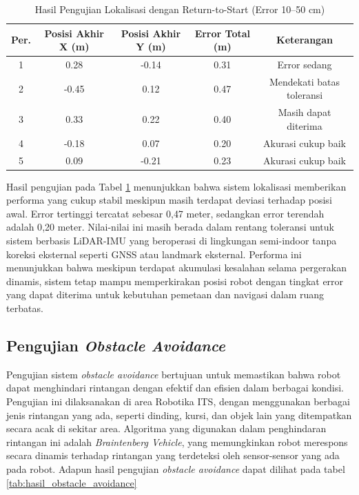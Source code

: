 \begin{table}[H]
	\centering
	\caption{Hasil Pengujian Lokalisasi dengan Return-to-Start (Error 10--50 cm)}
	\label{tab:hasil_localization}
	\begin{tabular}{|c|c|c|c|c|}
		\hline
		\textbf{Per.} & \textbf{Posisi Akhir X (m)} & \textbf{Posisi Akhir Y (m)} & \textbf{Error Total (m)} & \textbf{Keterangan}       \\
		\hline
		1             & 0.28                        & -0.14                       & 0.31                     & Error sedang              \\
		2             & -0.45                       & 0.12                        & 0.47                     & Mendekati batas toleransi \\
		3             & 0.33                        & 0.22                        & 0.40                     & Masih dapat diterima      \\
		4             & -0.18                       & 0.07                        & 0.20                     & Akurasi cukup baik        \\
		5             & 0.09                        & -0.21                       & 0.23                     & Akurasi cukup baik        \\
		\hline
	\end{tabular}
\end{table}

Hasil pengujian pada Tabel \ref{tab:hasil_localization} menunjukkan bahwa sistem lokalisasi memberikan performa yang cukup stabil meskipun masih terdapat deviasi terhadap posisi awal. Error tertinggi tercatat sebesar 0{,}47 meter, sedangkan error terendah adalah 0{,}20 meter. Nilai-nilai ini masih berada dalam rentang toleransi untuk sistem berbasis LiDAR-IMU yang beroperasi di lingkungan semi-indoor tanpa koreksi eksternal seperti GNSS atau landmark eksternal. Performa ini menunjukkan bahwa meskipun terdapat akumulasi kesalahan selama pergerakan dinamis, sistem tetap mampu memperkirakan posisi robot dengan tingkat error yang dapat diterima untuk kebutuhan pemetaan dan navigasi dalam ruang terbatas.

\subsection{Pengujian \emph{Obstacle Avoidance}}
Pengujian sistem \emph{obstacle avoidance} bertujuan untuk memastikan bahwa robot dapat menghindari rintangan dengan efektif dan efisien dalam berbagai kondisi. Pengujian ini dilaksanakan di area Robotika ITS, dengan menggunakan berbagai jenis rintangan yang ada, seperti dinding, kursi, dan objek lain yang ditempatkan secara acak di sekitar area. Algoritma yang digunakan dalam penghindaran rintangan ini adalah \emph{Braintenberg Vehicle}, yang memungkinkan robot merespons secara dinamis terhadap rintangan yang terdeteksi oleh sensor-sensor yang ada pada robot. Adapun hasil pengujian \emph{obstacle avoidance} dapat dilihat pada tabel \ref{tab:hasil_obstacle_avoidance}

